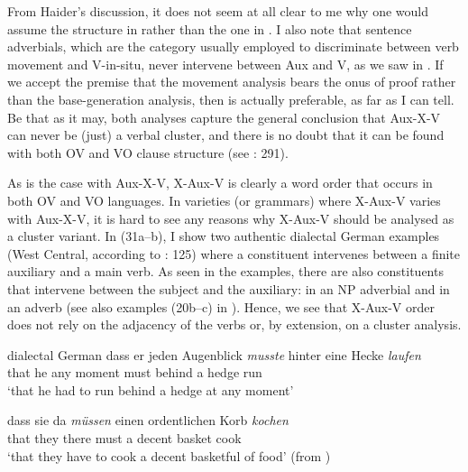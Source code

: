 \documentclass[output=paper, colorlinks, citecolor=brown]{langscibook}
\begin{document}
\settowidth{}
\ea
\label{ex:sangfelt:30}
 
 
\z 
\z

From Haider’s discussion, it does not seem at all clear to me why one would assume the structure in  rather than the one in . I also note that sentence adverbials, which are the category usually employed to discriminate between verb movement and V-in-situ, never intervene between Aux and V, as we saw in . If we accept the premise that the movement analysis bears the onus of proof rather than the base-generation analysis, then  is actually preferable, as far as I can tell. Be that as it may, both analyses capture the general conclusion that Aux-X-V can never be (just) a verbal cluster, and there is no doubt that it can be found with both OV and VO clause structure (see \citealt{Haider2010}: 291).


As is the case with Aux-X-V, X-Aux-V is clearly a word order that occurs in both OV and VO languages. In varieties (or grammars) where X-Aux-V varies with Aux-X-V, it is hard to see any reasons why X-Aux-V should be analysed as a cluster variant. In (31a–b), I show two authentic dialectal German examples (West Central, according to \citealt{Sapp2011}: 125) where a constituent intervenes between a finite auxiliary and a main verb. As seen in the examples, there are also constituents that intervene between the subject and the auxiliary: in  an NP adverbial and in  an adverb (see also examples (20b–c) in ). Hence, we see that X-Aux-V order does not rely on the adjacency of the verbs or, by extension, on a cluster analysis.



\ea dialectal German
\label{ex:sangfelt:31}
\ea\label{ex:sangfelt:31a}
\gll dass er {jeden} {Augenblick} \textit{musste}  {hinter} {eine} {Hecke} \textit{laufen} \\
that he any moment must behind a hedge run\\
\glt ‘that he had to run behind a hedge at any moment’

\ex\label{ex:sangfelt:31b}
\gll dass sie {da} \textit{müssen} {einen} {ordentlichen} {Korb} \textit{kochen}\\
that they there must a decent basket cook\\
\glt ‘that they have to cook a decent basketful of food’ (from \citealt[126]{Sapp2011})\\
\z 
\z 
\end{document}
